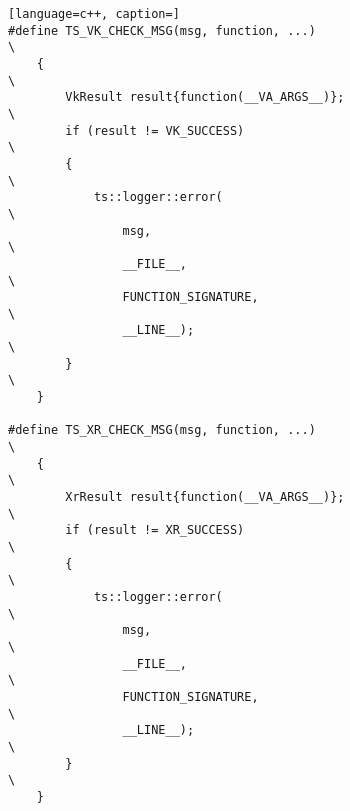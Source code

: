 \begin{lstlisting}[language=c++, caption=]
#define TS_VK_CHECK_MSG(msg, function, ...)                                                                \
    {                                                                                                      \
        VkResult result{function(__VA_ARGS__)};                                                            \
        if (result != VK_SUCCESS)                                                                          \
        {                                                                                                  \
            ts::logger::error(                                                                             \
                msg,                                                                                       \
                __FILE__,                                                                                  \
                FUNCTION_SIGNATURE,                                                                        \
                __LINE__);                                                                                 \
        }                                                                                                  \
    }

#define TS_XR_CHECK_MSG(msg, function, ...)                                                                \
    {                                                                                                      \
        XrResult result{function(__VA_ARGS__)};                                                            \
        if (result != XR_SUCCESS)                                                                          \
        {                                                                                                  \
            ts::logger::error(                                                                             \
                msg,                                                                                       \
                __FILE__,                                                                                  \
                FUNCTION_SIGNATURE,                                                                        \
                __LINE__);                                                                                 \
        }                                                                                                  \
    }
\end{lstlisting}